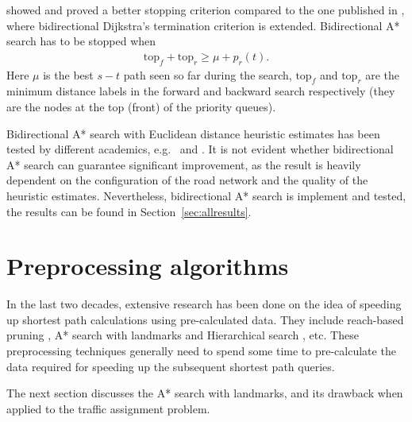 \citet{GoldbergEPP} showed and proved a better stopping criterion compared to the one published in \citet{Pohl},
where bidirectional Dijkstra's termination criterion is extended.
Bidirectional A* search has to be stopped when
\begin{align}
    \text{top}_f + \text{top}_r \geq \mu + p_r(t).
\end{align}
Here $\mu$ is the best $s-t$ path seen so far during the search,
$\text{top}_f$ and $\text{top}_r$ are the minimum distance labels in the forward and backward search respectively (they are the nodes at the top (front) of the priority queues).

Bidirectional A* search with Euclidean distance heuristic estimates has been tested by different academics, e.g.\ \citet{Klunder} and \citet{Goldberg05}.
It is not evident whether bidirectional A* search can guarantee significant improvement,
as the result is heavily dependent on the configuration of the road network and the quality of the heuristic estimates.
Nevertheless, bidirectional A* search is implement and tested, the results can be found in Section~\ref{sec:allresults}.

\section{Preprocessing algorithms}
In the last two decades,
extensive research has been done on the idea of speeding up shortest path calculations using pre-calculated data.
They include reach-based pruning \citep{Goldberg}, A* search with landmarks \citep{GoldbergLandmarks} and Hierarchical search \citep{Ertl1998, Pearson}, etc.
These preprocessing techniques generally need to spend some time to pre-calculate the data required for speeding up the subsequent shortest path queries.

The next section discusses the A* search with landmarks,
and its drawback when applied to the traffic assignment problem.

